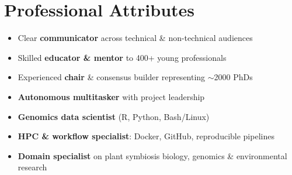 \documentclass[a4paper,10pt]{article}
\begin{document}
{\begin{adjustbox}{valign=t}
\begin{minipage}[t]{0.3\textwidth}
{\section*{Professional Attributes}
\begin{spacing}{1}
\begin{itemize}
  \setlength{\itemindent}{-0.7em}
  \setlength{\itemsep}{0.0em}
  \item Clear \textbf{communicator} across technical \& non-technical audiences
  \item Skilled \textbf{educator \& mentor} to 400+ young professionals
  \item Experienced \textbf{chair} \& consensus builder representing $\sim$2000 PhDs
  \item \textbf{Autonomous multitasker} with project leadership
  \item \textbf{Genomics data scientist} (R, Python, Bash/Linux)
  \item \textbf{HPC \& workflow specialist}: Docker, GitHub, reproducible pipelines
  \item \textbf{Domain specialist} on plant symbiosis biology, genomics \& environmental research 
\end{itemize}
\end{spacing}
}


\end{minipage}%
\end{adjustbox}%
\hfill%


\begin{adjustbox}{valign=t}
\hfill%
\begin{minipage}[t]{0.05\textwidth}
\MyVerticalRule
\end{minipage}%
\end{adjustbox}

\begin{adjustbox}{valign=t}
\hfill%
\begin{minipage}[t]{0.6\textwidth}



\end{minipage}
\end{adjustbox}}
\end{document}
